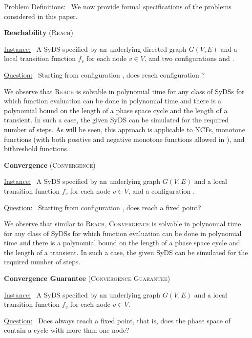 \underline{\textsf{Problem Definitions:}}~ We now provide
formal specifications of the problems considered in this paper.

\smallskip
\noindent
\textbf{Reachability} (\textsc{Reach})

\smallskip
\noindent
\underline{\textsf{Instance:}}~ A SyDS \cals{} specified 
by an underlying directed
graph $G(V,E)$ and a local transition function $f_v$ for each node $v \in V$,
and two configurations \calc{} and \cald{}. 

\noindent
\underline{\textsf{Question:}}~ Starting from configuration \calc,
does \cals{} reach configuration \cald? 

We observe that \textsc{Reach} is solvable in polynomial time for
any class of SyDSs for which function evaluation can be done in
polynomial time and there is a polynomial bound on the length of a
phase space cycle and the length of a transient.  In such a case,
the given SyDS can be simulated for the required number of steps.
As will be seen, this approach is applicable to NCFs, monotone
functions (with both positive and negative monotone functions allowed
in \cals{}), and bithreshold functions.

\smallskip
\noindent
\textbf{Convergence} (\textsc{Convergence})

\smallskip
\noindent
\underline{\textsf{Instance:}}~ A SyDS \cals{} specified 
by an underlying
graph $G(V,E)$ and a local transition function $f_v$ for each node $v \in V$,
and a configuration \calc{}. 

\noindent
\underline{\textsf{Question:}}~ Starting from configuration \calc,
does  \cals{} reach a fixed point? 

We observe that similar to \textsc{Reach}, \textsc{Convergence} is
solvable in polynomial time for any class of SyDSs for which function
evaluation can be done in polynomial time and there is a polynomial
bound on the length of a phase space cycle and the length of a
transient.  In such a case, the given SyDS can be simulated for the
required number of steps.


\smallskip
\noindent
\textbf{Convergence Guarantee} (\textsc{Convergence Guarantee})

\smallskip
\noindent
\underline{\textsf{Instance:}}~ A SyDS \cals{} specified 
by an underlying
graph $G(V,E)$ and a local transition function $f_v$ for each node $v \in V$. 

\noindent
\underline{\textsf{Question:}}~ Does  \cals{} always reach a fixed point,
that is, does the phase space of  \cals{} contain a cycle with more than one node? 


